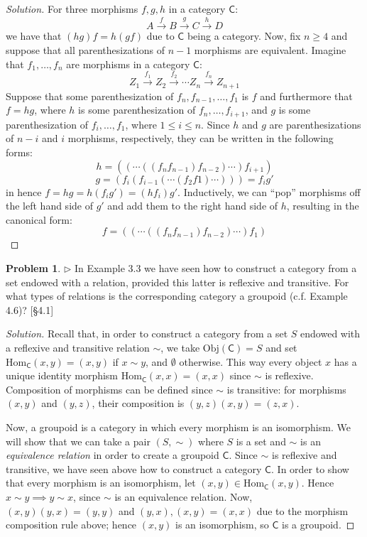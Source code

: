 \documentclass[fontsize=14pt]{scrartcl}
\theoremstyle{definition}
\newtheorem{problem-internal}{Problem}[subsection]
\newenvironment{problem}{
  \medskip
  \begin{problem-internal}
}{
  \end{problem-internal}
}
\newenvironment{solution}{
  \begin{proof}[Solution]
  \vspace{-8px}
  \setlength{\parskip}{4px}
  \setlength{\parindent}{0px}
}{
  \end{proof}
}
\newcommand{\Obj}{\mathrm{Obj}}
\newcommand{\Hom}{\mathrm{Hom}}
\begin{document}
\begin{solution}
\def \C {\mathsf{C}}
For three morphisms $f,g,h$ in a category $\C$:
%
\[ A \xrightarrow{f} B \xrightarrow{g} C \xrightarrow{h} D \]
%
we have that $(hg)f = h(gf)$ due to $\C$ being a category. Now, fix $n\geq 4$
and suppose that all parenthesizations of $n-1$ morphisms are equivalent.
Imagine that $f_1, \dots, f_n$ are morphisms in a category $\C$:
%
\[ Z_1 \xrightarrow{f_1} Z_2 \xrightarrow{f_2} \cdots Z_n \xrightarrow{f_n}
Z_{n+1} \]
%
Suppose that some parenthesization of $f_n, f_{n-1}, \dots, f_1$ is $f$ and
furthermore that $f=hg$, where $h$ is some parenthesization of $f_n, \dots,
f_{i+1}$, and $g$ is some parenthesization of $f_i, \dots, f_1$, where $1\leq
i\leq n$. Since $h$ and $g$ are parenthesizations of $n-i$ and $i$ morphisms,
respectively, they can be written in the following forms:
%
\[ h = ((\cdots((f_nf_{n-1})f_{n-2})\cdots)f_{i+1}) \]
\[ g = (f_i(f_{i-1}(\cdots(f_2f1)\cdots))) = f_ig' \]
%
in hence $f=hg=h(f_ig')=(hf_i)g'$. Inductively, we can ``pop'' morphisms off the
left hand side of $g'$ and add them to the right hand side of $h$, resulting in
the canonical form:
%
\[ f = ((\cdots((f_nf_{n-1})f_{n-2})\cdots)f_1) \]
\end{solution}


\begin{problem}
$\rhd$ In Example 3.3 we have seen how to construct a category from a set
endowed with a relation, provided this latter is reflexive and transitive. For
what types of relations is the corresponding category a groupoid (c.f. Example
4.6)? [\S 4.1]
\end{problem}

\begin{solution}
\def \C {\mathsf{C}}
Recall that, in order to construct a category from a set $S$ endowed with a
reflexive and transitive relation $\sim$, we take $\Obj(\C) = S$ and set
$\Hom_\C(x,y) = {(x,y)}$ if $x\sim y$, and $\emptyset$ otherwise. This way every
object $x$ has a unique identity morphism $\Hom_\C(x,x)=(x,x)$ since $\sim$ is
reflexive.  Composition of morphisms can be defined since $\sim$ is transitive:
for morphisms $(x,y)$ and $(y,z)$, their composition is $(y,z)(x,y) = (z,x)$.

Now, a groupoid is a category in which every morphism is an isomorphism. We will
show that we can take a pair $(S,\sim)$ where $S$ is a set and $\sim$ is an
\textit{equivalence relation} in order to create a groupoid $\C$. Since $\sim$
is reflexive and transitive, we have seen above how to construct a category
$\C$. In order to show that every morphism is an isomorphism, let
$(x,y)\in\Hom_\C(x,y)$. Hence $x\sim y \implies y\sim x$, since $\sim$ is an
equivalence relation. Now, $(x,y)(y,x) = (y,y)$ and $(y,x),(x,y) = (x,x)$ due to
the morphism composition rule above; hence $(x,y)$ is an isomorphism, so $\C$ is
a groupoid.
\end{solution}
\end{document}
